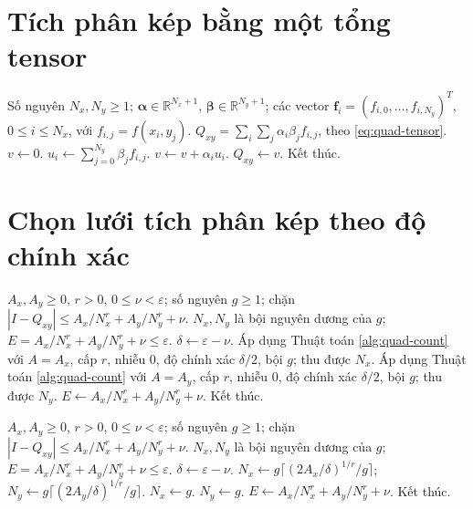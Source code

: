 \documentclass[12pt,a4paper,oneside]{book}
\numberwithin{algorithm}{chapter}
\theoremstyle{definition}
\newcommand{\R}{\mathbb{R}}
\begin{document}
\section{Tích phân kép bằng một tổng tensor}
\begin{algorithm}[H]
\caption{Tính tích phân kép từ các trọng số theo từng chiều}
\label{alg:quad-tensor}
\begin{algorithmic}[1]
\Require Số nguyên $N_x,N_y\geq1$; $\boldsymbol\alpha\in\R^{N_x+1}$, $\boldsymbol\beta\in\R^{N_y+1}$; các vector $\boldsymbol f_i=(f_{i,0},\ldots,f_{i,N_y})^T$, $0\leq i\leq N_x$, với $f_{i,j}=f(x_i,y_j)$.
\Ensure $Q_{xy}=\sum_i\sum_j\alpha_i\beta_jf_{i,j}$, theo \eqref{eq:quad-tensor}.
\State $v\gets0$.
  \State $u_i\gets\sum_{j=0}^{N_y}\beta_jf_{i,j}$.
  \State $v\gets v+\alpha_i u_i$.
\EndFor
\Statex
\State $Q_{xy}\gets v$.
\State Kết thúc.
\end{algorithmic}
\end{algorithm}

\section{Chọn lưới tích phân kép theo độ chính xác}
\begin{algorithm}[H]
\caption{Chọn số đoạn theo hai chiều -- sơ lược}
\label{alg:quad-tensor-count}
\begin{algorithmic}[1]
\Require $A_x,A_y\geq0$, $r>0$, $0\leq\nu<\varepsilon$; số nguyên $g\geq1$; chặn $|I-Q_{xy}|\leq A_x/N_x^r+A_y/N_y^r+\nu$.
\Ensure $N_x,N_y$ là bội nguyên dương của $g$; $E=A_x/N_x^r+A_y/N_y^r+\nu\leq\varepsilon$.
\State $\delta\gets\varepsilon-\nu$.
\State Áp dụng Thuật toán \ref{alg:quad-count} với $A=A_x$, cấp $r$, nhiễu $0$, độ chính xác $\delta/2$, bội $g$; thu được $N_x$.
\State Áp dụng Thuật toán \ref{alg:quad-count} với $A=A_y$, cấp $r$, nhiễu $0$, độ chính xác $\delta/2$, bội $g$; thu được $N_y$.
\State $E\gets A_x/N_x^r+A_y/N_y^r+\nu$.
\State Kết thúc.
\end{algorithmic}
\end{algorithm}

\begin{algorithm}[H]
\caption{Chọn số đoạn theo hai chiều -- chi tiết}
\label{alg:quad-tensor-count-detailed}
\begin{algorithmic}[1]
\Require $A_x,A_y\geq0$, $r>0$, $0\leq\nu<\varepsilon$; số nguyên $g\geq1$; chặn $|I-Q_{xy}|\leq A_x/N_x^r+A_y/N_y^r+\nu$.
\Ensure $N_x,N_y$ là bội nguyên dương của $g$; $E=A_x/N_x^r+A_y/N_y^r+\nu\leq\varepsilon$.
\State $\delta\gets\varepsilon-\nu$.
\State $N_x\gets g\lceil(2A_x/\delta)^{1/r}/g\rceil$; $N_y\gets g\lceil(2A_y/\delta)^{1/r}/g\rceil$.
  \State $N_x\gets g$.
\EndIf
\Statex
{}
  \State $N_y\gets g$.
\EndIf
\Statex
\State $E\gets A_x/N_x^r+A_y/N_y^r+\nu$.
\State Kết thúc.
\end{algorithmic}
\end{algorithm}
\end{document}
